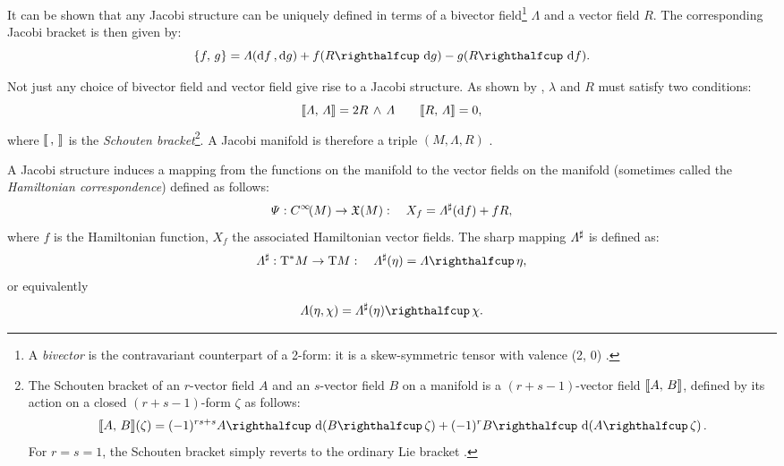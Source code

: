 It can be shown that any Jacobi structure can be uniquely defined in terms of a bivector field\footnote{A \emph{bivector} is the contravariant counterpart of a 2-form: it is a skew-symmetric tensor with valence (2, 0) \cite{einstein1944}.} \(\Lambda\) and a vector field \(R\). The corresponding Jacobi bracket is then given by: \cite{Libermann1987,marle1991}
\begin{equation}
     \jacobi{f}{g} = \Lambda(\dd{f}, \dd{g}) + f (\intpr{R}{\dd{g}}) - g (\intpr{R}{\dd{f}}).
\end{equation}

Not just any choice of bivector field and vector field give rise to a Jacobi structure. As shown by \citet{lichnerowicz1977}, \(\lambda\) and \(R\) must satisfy two conditions:
\begin{equation}
     \llbracket\Lambda,\,\Lambda\rrbracket = 2  R\,\wedge\,\Lambda  \qquad \llbracket R,\,\Lambda\rrbracket = 0,
\end{equation}
where \(\llbracket\,,\,\rrbracket\) is the \emph{Schouten bracket}\footnote
{
    The Schouten bracket of an \(r\)-vector field \(A\) and an \(s\)-vector field \(B\) on a manifold is a \((r + s - 1)\)-vector field \(\llbracket A,\,B\rrbracket\), defined by its action on a closed \((r + s -1)\)-form \(\zeta\) as follows:
    \begin{equation}
     \schouten{A}{B}(\zeta) = (-1)^{rs + s}\intpr{A}{\dd{(\intpr{B}{\zeta})}} + (-1)^r \intpr{B}{\dd{(\intpr{A}{\zeta})}}.
\end{equation}
    For \(r = s = 1\), the Schouten bracket simply reverts to the ordinary Lie bracket \cite{dazord1991}.

}. A Jacobi manifold is therefore a triple \((M, \Lambda, R)\) \cite{Libermann1987}.

A Jacobi structure induces a mapping from the functions on the manifold to the vector fields on the manifold (sometimes called the \emph{Hamiltonian correspondence}) \cite{ciaglia2018,mahmood2012} defined as follows:
\begin{equation} 
    \Psi: C^\infty\!\qty(M) \to \mathfrak{X}\qty(M): \quad X_f = \Lambda^\sharp(\dd{f}) + f R,
    \label{eq:jacobi_ham_correspondence}
\end{equation}
where \(f\) is the Hamiltonian function, \(X_f\) the associated Hamiltonian vector fields. The sharp mapping \(\Lambda^\sharp\) is defined as:
\begin{equation}
     \fromDual{\Lambda}: \ctbundle{M} \to \tbundle{M}: \quad \fromDual{\Lambda}(\eta) = \intpr{\Lambda}{\eta},
\end{equation}
or equivalently
\begin{equation}
     \Lambda(\eta, \chi)  = \intpr{\fromDual{\Lambda}(\eta)}{\chi}.
\end{equation}


